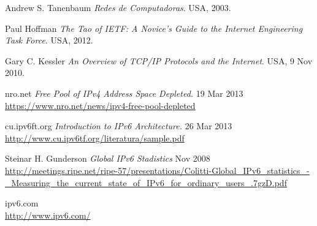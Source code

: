 \documentclass[11pt,a4paper]{article}
\begin{document}
\newpage
\begin{thebibliography}{9}

  Andrew S. Tanenbaum
  \emph{Redes de Computadoras}.
  USA,
  2003.

  Paul Hoffman
  \emph{The Tao of IETF: A Novice's Guide to the Internet Engineering Task Force}.
  USA,
  2012.
		
  Gary C. Kessler
  \emph{An Overview of TCP/IP Protocols and the Internet}.
  USA,
  9 Nov 2010.
		
 nro.net
 \emph{Free Pool of IPv4 Address Space Depleted.} 
 19 Mar 2013\\
	\url{https://www.nro.net/news/ipv4-free-pool-depleted}	

 cu.ipv6ft.org 
 \emph{Introduction to IPv6 Architecture.} 
 26 Mar 2013\\
	\url{http://www.cu.ipv6tf.org/literatura/sample.pdf}

 Steinar H. Gunderson
 \emph{Global IPv6 Stadistics}
 Nov 2008\\
 \url{http://meetings.ripe.net/ripe-57/presentations/Colitti-Global_IPv6_statistics_-
 _Measuring_the_current_state_of_IPv6_for_ordinary_users_.7gzD.pdf}
		
 ipv6.com\\
 \url{http://www.ipv6.com/}		
					
\end{thebibliography}
\end{document}
